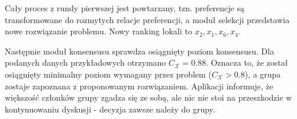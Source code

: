 Cały proces z rundy pierwszej jest powtarzany, tzn. preferencje są
transformowane do rozmytych relacje preferencji, a moduł selekcji przedstawia
nowe rozwiązanie problemu. Nowy ranking lokali to $x_2, x_1, x_6, x_4$.

Następnie moduł konsensusu sprawdza osiągnięty poziom konsensusu. Dla podanych
danych przykładowych otrzymano $C_{\mathcal{X}} = 0.88$. Oznacza to, że został
osiągnięty minimalny poziom wymagany przez problem ($C_{\mathcal{X}} > 0.8$),
a grupa zostaje zapoznana z proponowanym rozwiązaniem. Aplikacji informuje, że
większość członków grupy zgadza się ze sobą, ale nic nie stoi na przeszkodzie w
kontynuowaniu dyskusji - decyzja zawsze należy do grupy.

